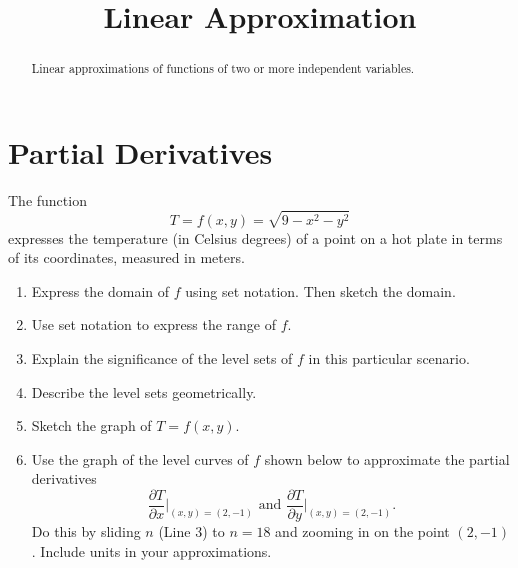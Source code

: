 \documentclass{ximera}
\title{Linear Approximation}
\begin{document}
\begin{abstract}
Linear approximations of functions of two or more independent variables.
\end{abstract}
\maketitle


\section{Partial Derivatives}

\begin{example}  \label{Edgtr543}

The function
\[
    T = f(x,y) = \sqrt{9-x^2-y^2}
\]
expresses the temperature (in Celsius degrees) of a point on a hot plate in terms of its coordinates, measured in meters. 

\begin{enumerate}

\item Express the domain of $f$ using set notation. Then sketch the domain.

\item Use set notation to express the range of $f$.

\item Explain the significance of the level sets of $f$ in this particular scenario.

\item Describe the level sets geometrically.

\item Sketch the graph of $T=f(x,y)$.

\item Use the graph of the level curves of $f$ shown below to approximate the partial derivatives 
\[
    \frac{\partial T}{\partial x}\Big|_{(x,y)=(2,-1)} \text{ and } \frac{\partial T}{\partial y}\Big|_{(x,y)=(2,-1)} .
\]
Do this by sliding $n$ (Line 3) to $n=18$ and zooming in on the point $(2,-1)$. Include units in your approximations.





\end{enumerate}
\end{example}
\end{document}
